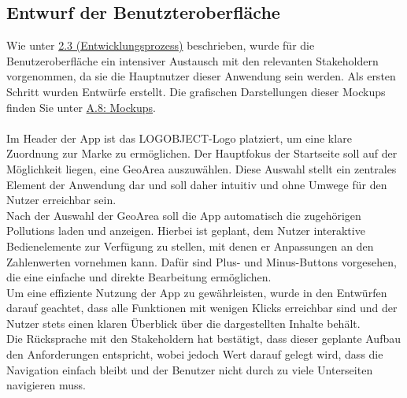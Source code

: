 \documentclass[a4paper,12pt]{article}
\begin{document}
\subsection{Entwurf der Benutzteroberfläche}
Wie unter \hyperref[sec:entwicklungsprozess]{2.3 (Entwicklungsprozess)} beschrieben, wurde für die Benutzeroberfläche ein intensiver Austausch mit den relevanten Stakeholdern vorgenommen, da sie die Hauptnutzer dieser Anwendung sein werden. Als ersten Schritt wurden Entwürfe erstellt. Die grafischen Darstellungen dieser Mockups finden Sie unter \hyperref[sec:mockups]{A.8: Mockups}.\\
\\
Im Header der App ist das \glqq LOGOBJECT\grqq{}-Logo platziert, um eine klare Zuordnung zur Marke zu ermöglichen. Der Hauptfokus der Startseite soll auf der Möglichkeit liegen, eine GeoArea auszuwählen. Diese Auswahl stellt ein zentrales Element der Anwendung dar und soll daher intuitiv und ohne Umwege für den Nutzer erreichbar sein.\\
Nach der Auswahl der GeoArea soll die App automatisch die zugehörigen Pollutions laden und anzeigen. Hierbei ist geplant, dem Nutzer interaktive Bedienelemente zur Verfügung zu stellen, mit denen er Anpassungen an den Zahlenwerten vornehmen kann. Dafür sind Plus- und Minus-Buttons vorgesehen, die eine einfache und direkte Bearbeitung ermöglichen.\\
Um eine effiziente Nutzung der App zu gewährleisten, wurde in den Entwürfen darauf geachtet, dass alle Funktionen mit wenigen Klicks erreichbar sind und der Nutzer stets einen klaren Überblick über die dargestellten Inhalte behält.\\
Die Rücksprache mit den Stakeholdern hat bestätigt, dass dieser geplante Aufbau den Anforderungen entspricht, wobei jedoch Wert darauf gelegt wird, dass die Navigation einfach bleibt und der Benutzer nicht durch zu viele Unterseiten navigieren muss.
\end{document}
